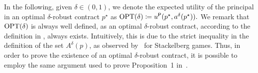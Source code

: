 In the following, given $\delta \in (0,1)$, we denote the expected utility of the principal in an optimal $\delta$-robust contract $p^\star $ as $\textnormal{OPT}(\delta) \coloneqq u^{\mathsf{P}}(p^\star, a^\delta(p^\star)).$
%
We remark that $\textnormal{OPT}(\delta)$ is always well defined, as an optimal $\delta$-robust contract, according to the definition in , always exists.
%
Intuitively, this is due to the strict inequality in the definition of the set $A^\delta(p)$, as observed by~\citet{gan2024robust} for Stackelberg games.
%
Thus, in order to prove the existence of an optimal $\delta$-robust contract, it is possible to employ the same argument used to prove
Proposition~1 in~\citep{gan2024robust}.
%

